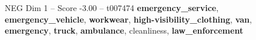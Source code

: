 \begin{textsample}{NEG Dim 1 – Score -3.00 – t007474}  \label{ex:f1_neg_036}
\textbf{emergency\_service}, \textbf{emergency\_vehicle}, \textbf{workwear}, \textbf{high-visibility\_clothing}, \textbf{van}, \textbf{emergency}, \textbf{truck}, \textbf{ambulance}, cleanliness, \textbf{law\_enforcement}

\end{textsample}

